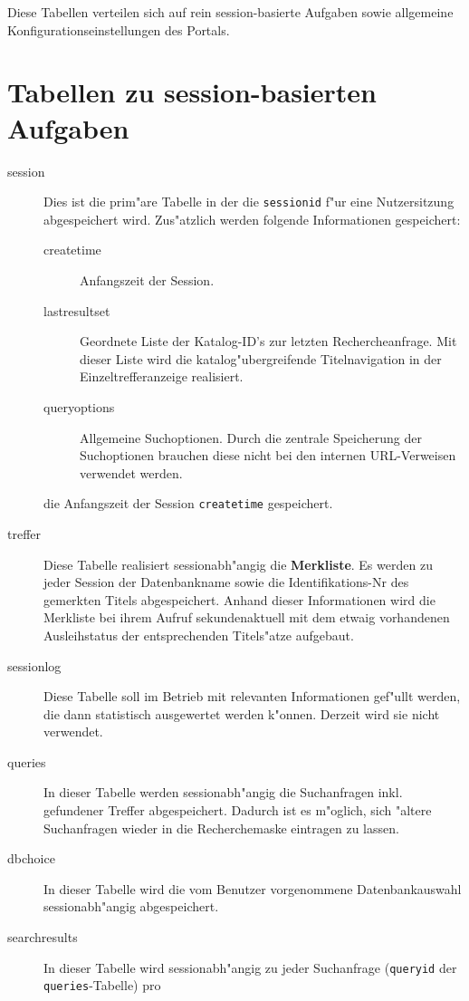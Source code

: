 \documentclass[11pt, twoside, a4paper, BCOR8mm, DIV12, bibtotoc,idxtotoc]{scrbook}
\begin{document}
\begin{itemize}
Diese Tabellen verteilen sich auf rein session-basierte Aufgaben sowie
allgemeine Konfigurationseinstellungen des Portals.


\section{Tabellen zu session-basierten Aufgaben}

\begin{description}
\item[session] Dies ist die prim"are Tabelle in der die
  \texttt{sessionid} f"ur eine Nutzersitzung abgespeichert wird.
  Zus"atzlich werden folgende Informationen gespeichert:
  \begin{description}
  \item[createtime] Anfangszeit der Session.
  \item[lastresultset] Geordnete Liste der Katalog-ID's zur letzten
    Rechercheanfrage. Mit dieser Liste wird die katalog"ubergreifende
    Titelnavigation in der Einzeltrefferanzeige realisiert.
  \item[queryoptions] Allgemeine Suchoptionen. Durch die zentrale Speicherung der
    Suchoptionen brauchen diese nicht bei den internen URL-Verweisen
    verwendet werden.
  \end{description}
die Anfangszeit der Session \texttt{createtime}
  gespeichert. 
\item[treffer] Diese Tabelle realisiert sessionabh"angig die
  \textbf{Merkliste}. Es werden zu jeder Session der Datenbankname sowie die
  Identifikations-Nr des gemerkten Titels abgespeichert. Anhand dieser
  Informationen wird die Merkliste bei ihrem Aufruf sekundenaktuell
  mit dem etwaig vorhandenen Ausleihstatus der entsprechenden
  Titels"atze aufgebaut.
\item[sessionlog] Diese Tabelle soll im Betrieb mit relevanten
  Informationen gef"ullt werden, die dann statistisch ausgewertet
  werden k"onnen. Derzeit wird sie nicht verwendet.
\item[queries] In dieser Tabelle werden sessionabh"angig die
  Suchanfragen inkl. gefundener Treffer ab\-ge\-spei\-chert. Dadurch ist es
  m"oglich, sich "altere Suchanfragen wieder in die Recherchemaske
  eintragen zu lassen.
\item[dbchoice] In dieser Tabelle wird die vom Benutzer vorgenommene
  Datenbankauswahl session\-ab\-h"angig abgespeichert.
\item[searchresults] In dieser Tabelle wird session\-ab\-h"an\-gig zu jeder
  Suchanfrage (\texttt{queryid} der \texttt{queries}-Tabelle) pro

\end{description}
\end{itemize}
\end{document}
